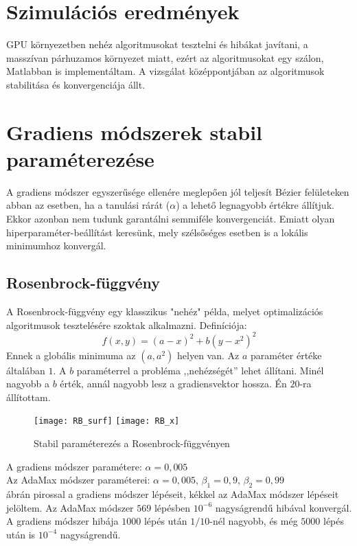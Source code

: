 \section{Szimulációs eredmények}

GPU környezetben nehéz algoritmusokat tesztelni és hibákat javítani, a masszívan párhuzamos környezet miatt, ezért az algoritmusokat egy szálon, Matlabban is implementáltam. A vizsgálat középpontjában az algoritmusok stabilitása és konvergenciája állt. 

\section{Gradiens módszerek stabil paraméterezése}

A gradiens módszer egyszerűsége ellenére meglepően jól teljesít Bézier felületeken abban az esetben, ha a tanulási rárát ($\alpha$) a lehető legnagyobb értékre állítjuk. Ekkor azonban nem tudunk garantálni semmiféle konvergenciát. Emiatt olyan hiperparaméter-beállítást keresünk, mely szélsőséges esetben is a lokális minimumhoz konvergál.

\subsection{Rosenbrock-függvény}
A Rosenbrock-függvény egy klasszikus "nehéz" példa, melyet optimalizációs algoritmusok tesztelésére szoktak alkalmazni. Definíciója:
$$ f(x,y) = (a-x)^2 + b(y-x^2)^2 $$
Ennek a globális minimuma az $(a,a^2)$ helyen van. Az $a$ paraméter értéke általában $1$. A $b$ paraméterrel a probléma ,,nehézségét'' lehet állítani. Minél nagyobb a $b$ érték, annál nagyobb lesz a gradiensvektor hossza. Én $20$-ra állítottam.
\begin{figure}[H]
	\centering
	\texttt{[image: RB\_surf]}
	\hspace{5pt}
	\texttt{[image: RB\_x]}
	\caption{Stabil paraméterezés a Rosenbrock-függvényen}
	\label{fig:RB}
\end{figure}
A gradiens módszer paramétere: $\alpha = 0,005$ \\
Az AdaMax módszer paraméterei: $\alpha = 0,005$, $\beta_1 = 0,9$, $\beta_2 = 0,99$ \\
 ábrán pirossal a gradiens módszer lépéseit, kékkel az AdaMax módszer lépéseit jelöltem. Az AdaMax módszer $569$ lépésben $10^{-6}$ nagyságrendű hibával konvergál. A gradiens módszer hibája $1000$ lépés után $1/10$-nél nagyobb, és még $5000$ lépés után is $10^{-4}$ nagyságrendű.

